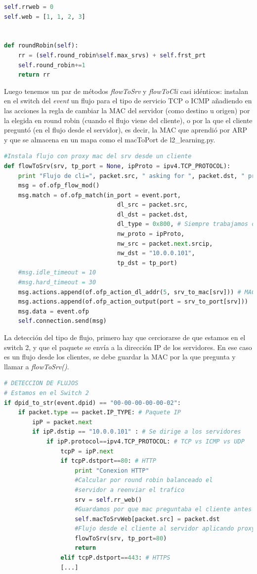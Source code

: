 \documentclass{article}
\begin{document}
\begin{lstlisting}[language=Python]
self.rrweb = 0
self.web = [1, 1, 2, 3]


def roundRobin(self):
	rr = (self.round_robin%self.max_srvs) + self.frst_prt
	self.round_robin+=1
	return rr
\end{lstlisting}


Luego tenemos un par de métodos \textit{flowToSrv} y \textit{flowToCli} casi idénticos: instalan en el switch del \textit{event} un flujo para el tipo de servicio TCP o ICMP añadiendo en las acciones la regla de cambiar la MAC del servidor (como destino u origen) por la elegida en round robin (cuando el flujo viene del cliente), o por la que el cliente preguntó (en el flujo desde el servidor), es decir, la MAC que aprendió por ARP y que se almacena en un mapa como el macToPort de l2\_learning.py.

\begin{lstlisting}[language=Python]
#Instala flujo con proxy mac del srv desde un cliente
def flowToSrv(srv, tp_port = None, ipProto = ipv4.TCP_PROTOCOL):
	print "Flujo de cli=", packet.src, " asking for ", packet.dst, " proxy a srv=", srv
	msg = of.ofp_flow_mod()
	msg.match = of.ofp_match(in_port = event.port,
								dl_src = packet.src,
								dl_dst = packet.dst,
								dl_type = 0x800, # Siempre trabajamos con IP
								nw_proto = ipProto,
								nw_src = packet.next.srcip,
								nw_dst = "10.0.0.101",
								tp_dst = tp_port)
	#msg.idle_timeout = 10
	#msg.hard_timeout = 30
	msg.actions.append(of.ofp_action_dl_addr(5, srv_to_mac[srv])) # MAC PROXY
	msg.actions.append(of.ofp_action_output(port = srv_to_port[srv]))
	msg.data = event.ofp
	self.connection.send(msg)
\end{lstlisting}

La detección del tipo de flujo, primero hay que cerciorarse de que estamos en el switch 2, y que el paquete se envía a la dirección IP de los servidores. En ese caso es un flujo desde los clientes, se debe guardar la MAC por la que pregunta y llamar a \textit{flowToSrv()}.

\begin{lstlisting}[language=Python]
# DETECCION DE FLUJOS
# Estamos en el Switch 2
if dpid_to_str(event.dpid) == "00-00-00-00-00-02":
	if packet.type == packet.IP_TYPE: # Paquete IP
		ipP = packet.next
		if ipP.dstip == "10.0.0.101" : # Se dirige a los servidores
			if ipP.protocol==ipv4.TCP_PROTOCOL: # TCP vs ICMP vs UDP
				tcpP = ipP.next
				if tcpP.dstport==80: # HTTP
					print "Conexion HTTP"
					#Calcular por round robin balanceado el
					#servidor a reenviar el trafico
					srv = self.rr_web()
					#Guardamos por que mac preguntaba el cliente antes de aplicar proxy
					self.macToSrvWeb[packet.src] = packet.dst
					#Flujo desde el cliente al servidor aplicando proxy mac del srv
					flowToSrv(srv, tp_port=80)
					return
				elif tcpP.dstport==443: # HTTPS
				[...]
\end{lstlisting}
\end{document}
